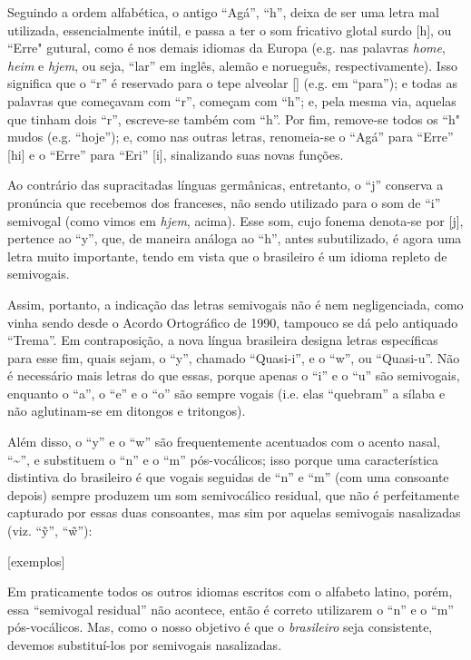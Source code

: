 \documentclass[12pt, a5paper, titlepage]{article}
\begin{document}
\begin{bilingualpages}
    Seguindo a ordem alfabética, o antigo ``Agá'', ``h'', deixa de ser uma letra mal utilizada, essencialmente inútil, e passa a ter o som fricativo glotal surdo [h], ou ``Erre" gutural, como é nos demais idiomas da Europa (e.g. nas palavras \textit{home}, \textit{heim} e \textit{hjem}, ou seja, ``lar'' em inglês, alemão e norueguês, respectivamente). Isso significa que o ``r'' é reservado para o tepe alveolar [\textfishhookr] (e.g. em ``para''); e todas as palavras que começavam com ``r'', começam com ``h''; e, pela mesma via, aquelas que tinham dois ``r'', escreve-se também com ``h''. Por fim, remove-se todos os ``h" mudos (e.g. ``hoje''); e, como nas outras letras, renomeia-se o ``Agá'' para ``Erre'' [\textepsilon hi] e o ``Erre'' para ``Eri'' [\textepsilon \textfishhookr i], sinalizando suas novas funções.

    Ao contrário das supracitadas línguas germânicas, entretanto, o ``j'' conserva a pronúncia que recebemos dos franceses, não sendo utilizado para o som de ``i'' semivogal (como vimos em \textit{hjem}, acima). Esse som, cujo fonema denota-se por [j], pertence ao ``y'', que, de maneira análoga ao ``h'', antes subutilizado, é agora uma letra muito importante, tendo em vista que o brasileiro é um idioma repleto de semivogais.
    
    Assim, portanto, a indicação das letras semivogais não é nem negligenciada, como vinha sendo desde o Acordo Ortográfico de 1990, tampouco se dá pelo antiquado ``Trema''. Em contraposição, a nova língua brasileira designa letras específicas para esse fim, quais sejam, o ``y'', chamado ``Quasi-i'', e o ``w'', ou ``Quasi-u''. Não é necessário mais letras do que essas, porque apenas o ``i'' e o ``u'' são semivogais, enquanto o ``a'', o ``e'' e o ``o'' são sempre vogais (i.e. elas ``quebram'' a sílaba e não aglutinam-se em ditongos e tritongos).
    
    Além disso, o ``y'' e o ``w'' são frequentemente acentuados com o acento nasal, ``\textasciitilde'', e substituem o ``n'' e o ``m'' pós-vocálicos; isso porque uma característica distintiva do brasileiro é que vogais seguidas de ``n'' e ``m'' (com uma consoante depois) sempre produzem um som semivocálico residual, que não é perfeitamente capturado por essas duas consoantes, mas sim por aquelas semivogais nasalizadas (viz. ``\~y'', ``\~w''):

    [exemplos]

    Em praticamente todos os outros idiomas escritos com o alfabeto latino, porém, essa ``semivogal residual'' não acontece, então é correto utilizarem o ``n'' e o ``m'' pós-vocálicos. Mas, como o nosso objetivo é que o \textit{brasileiro} seja consistente, devemos substituí-los por semivogais nasalizadas.


\end{bilingualpages}
\end{document}
